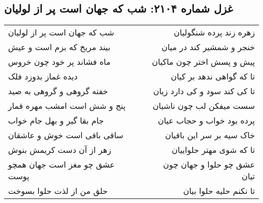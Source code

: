 \begin{center}
\section*{غزل شماره ۲۱۰۴: شب که جهان است پر از لولیان}
\label{sec:2104}
\begin{longtable}{l p{0.5cm} r}
شب که جهان است پر از لولیان
&&
زهره زند پرده شنگولیان
\\
بیند مریخ که بزم است و عیش
&&
خنجر و شمشیر کند در میان
\\
ماه فشاند پر خود چون خروس
&&
پیش و پسش اختر چون ماکیان
\\
دیده غماز بدوزد فلک
&&
تا که گواهی ندهد بر کیان
\\
خفته گروهی و گروهی به صید
&&
تا کی کند سود و کی دارد زیان
\\
پنج و شش است امشب مهره قمار
&&
سست میفکن لب چون ناشیان
\\
جام بقا گیر و بهل جام خواب
&&
پرده بود خواب و حجاب عیان
\\
ساقی باقی است خوش و عاشقان
&&
خاک سیه بر سر این باقیان
\\
زهر از آن دست کریمش بنوش
&&
تا که شوی مهتر حلواییان
\\
عشق چو مغز است جهان همچو پوست
&&
عشق چو حلوا و جهان چون تیان
\\
حلق من از لذت حلوا بسوخت
&&
تا نکنم حلیه حلوا بیان
\\
\end{longtable}
\end{center}
